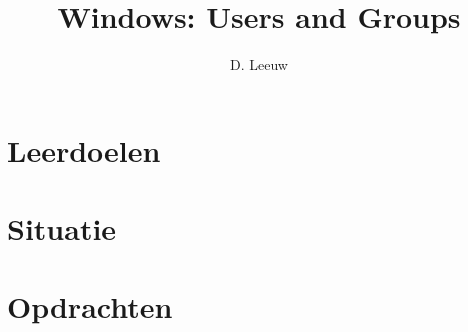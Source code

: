\documentclass[a4paper,12pt,twoside,titlepage]{article}
\author{D. Leeuw}
\title{Windows: Users and Groups}
\date{\today\\
0.0.0
\vfill
\raggedright
\copyright\ 2025-2026 Dennis Leeuw\\
}
\begin{document}

\maketitle



\section{Leerdoelen}


\section{Situatie}


\section{Opdrachten}


\printindex
\end{document}
